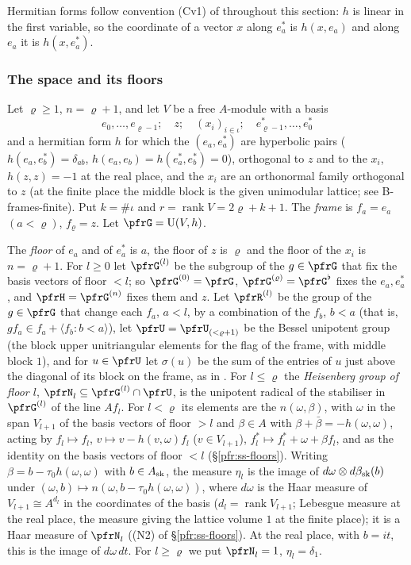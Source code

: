 \documentclass[10pt]{amsart}
\theoremstyle{definition}
\theoremstyle{remark}
\providecommand{\auU}{\mathrm U}
\begin{document}
Hermitian forms follow convention (Cv1) of {\cite[\S2.1]{P51}} throughout this section: $h$ is linear in the
first variable, so the coordinate of a vector $x$ along $e_a^*$ is $h(x,e_a)$ and along $e_a$ it is $h(x,e_a^*)$.

\subsubsection*{The space and its floors}
Let $\varrho\ge1$, $n=\varrho+1$, and let $V$ be a free $A$-module with a basis
\[
e_0,\dots,e_{\varrho-1};\quad z;\quad (x_i)_{i\in\iota};\quad e^*_{\varrho-1},\dots,e^*_0
\]
and a hermitian form $h$ for which the $(e_a,e^*_a)$ are hyperbolic pairs
($h(e_a,e^*_b)=\delta_{ab}$, $h(e_a,e_b)=h(e_a^*,e_b^*)=0$), orthogonal to $z$ and to the $x_i$,
$h(z,z)=-1$ at the real place, and the $x_i$ are an orthonormal family orthogonal to $z$ (at the
finite place the middle block is the given unimodular lattice; see \textup{B-frames-finite}). Put
$k=\#\iota$ and $r=\operatorname{rank}V=2\varrho+k+1$. The \emph{frame} is $f_a=e_a$ $(a<\varrho)$,
$f_\varrho=z$. Let $\pfrG=\auU(V,h)$.

The \emph{floor} of $e_a$ and of $e_a^*$ is $a$, the floor of $z$ is $\varrho$ and the floor of the
$x_i$ is $n=\varrho+1$. For $l\ge0$ let $\pfrG^{(l)}$ be the subgroup of the $g\in\pfrG$ that fix the
basis vectors of floor $<l$; so $\pfrG^{(0)}=\pfrG$, $\pfrG^{(\varrho)}=\pfrG^\flat$ fixes the
$e_a,e_a^*$, and $\pfrH=\pfrG^{(n)}$ fixes them and $z$. Let $\pfrR^{(l)}$ be the group of the $g\in\pfrG$
that change each $f_a$, $a<l$, by a combination of the $f_b$, $b<a$ (that is, $gf_a\in f_a+\langle
f_b:b<a\rangle$), let $\pfrU=\pfrU_{(<\varrho+1)}$ be the Bessel unipotent group (the block upper
unitriangular elements for the flag of the frame, with middle block $1$), and for $u\in\pfrU$ let
$\sigma(u)$ be the sum of the entries of $u$ just above the diagonal of its block on the frame, as in
{\cite[(4)]{P51}}. For $l\le\varrho$ the \emph{Heisenberg group of floor $l$}, $\pfrN_l\subseteq
\pfrG^{(l)}\cap\pfrU$, is the unipotent radical of the stabiliser in $\pfrG^{(l)}$ of the line
$Af_l$. For $l<\varrho$ its elements are the $n(\omega,\beta)$, with $\omega$ in the span $V_{l+1}$ of the
basis vectors of floor $>l$ and $\beta\in A$ with $\beta+\bar\beta=-h(\omega,\omega)$, acting by $f_l\mapsto f_l$,
$v\mapsto v-h(v,\omega)f_l$ ($v\in V_{l+1}$), $f_l^*\mapsto f_l^*+\omega+\beta f_l$, and as the identity on the basis
vectors of floor $<l$ (\S\ref{pfr:ss-floors}). Writing $\beta=b-\tau_0h(\omega,\omega)$ with $b\in A_{\rm sk}$, the
measure $\eta_l$ is the image of $d\omega\otimes d\beta_{\rm sk}(b)$ under $(\omega,b)\mapsto n(\omega,b-\tau_0h(\omega,\omega))$,
where $d\omega$ is the Haar measure of $V_{l+1}\cong A^{d_l}$ in the coordinates of the basis ($d_l=\operatorname{rank}
V_{l+1}$; Lebesgue measure at the real place, the measure giving the lattice volume $1$ at the finite place); it is a
Haar measure of $\pfrN_l$ ((N2) of \S\ref{pfr:ss-floors}). At the real place, with $b=it$, this is the image of
$d\omega\,dt$. For $l\ge\varrho$ we put $\pfrN_l=1$, $\eta_l=\delta_1$.
\end{document}
